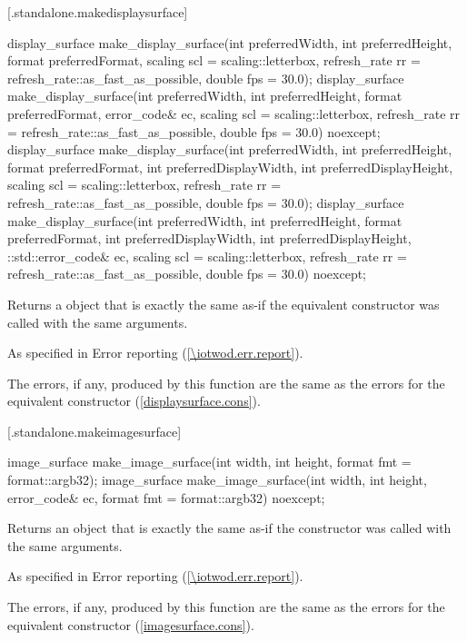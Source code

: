  [\iotwod.standalone.makedisplaysurface] {}

%
\begin{itemdecl}
display_surface make_display_surface(int preferredWidth,
  int preferredHeight, format preferredFormat,
  scaling scl = scaling::letterbox,
  refresh_rate rr = refresh_rate::as_fast_as_possible, double fps = 30.0);
display_surface make_display_surface(int preferredWidth,
  int preferredHeight, format preferredFormat, error_code& ec,
  scaling scl = scaling::letterbox,
  refresh_rate rr = refresh_rate::as_fast_as_possible, double fps = 30.0) 
  noexcept;
display_surface make_display_surface(int preferredWidth,
  int preferredHeight, format preferredFormat, int preferredDisplayWidth, 
  int preferredDisplayHeight, scaling scl = scaling::letterbox,
  refresh_rate rr = refresh_rate::as_fast_as_possible, double fps = 30.0);
display_surface make_display_surface(int preferredWidth,
  int preferredHeight, format preferredFormat, int preferredDisplayWidth, 
  int preferredDisplayHeight, ::std::error_code& ec,
  scaling scl = scaling::letterbox,
  refresh_rate rr = refresh_rate::as_fast_as_possible, double fps = 30.0) 
  noexcept;
\end{itemdecl}
\begin{itemdescr}
\pnum
\returns
Returns a  object that is exactly the same as-if the equivalent  constructor was called with the same arguments.

\pnum
\throws
As specified in Error reporting (\ref{\iotwod.err.report}).

\pnum
\errors
The errors, if any, produced by this function are the same as the errors for the equivalent  constructor (\ref{displaysurface.cons}).
\end{itemdescr}

 [\iotwod.standalone.makeimagesurface] {}

%
\begin{itemdecl}
image_surface make_image_surface(int width, int height,
  format fmt = format::argb32);
image_surface make_image_surface(int width, int height,
  error_code& ec, format fmt = format::argb32) noexcept;
\end{itemdecl}
\begin{itemdescr}
\pnum
\returns
Returns an  object that is exactly the same as-if the  constructor was called with the same arguments.

\pnum
\throws
As specified in Error reporting (\ref{\iotwod.err.report}).

\pnum
\errors
The errors, if any, produced by this function are the same as the errors for the equivalent  constructor (\ref{imagesurface.cons}).
\end{itemdescr}

